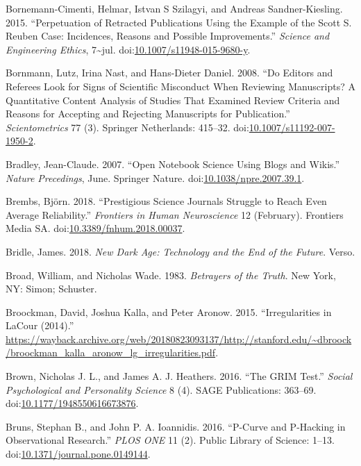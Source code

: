 \documentclass[a5paper]{book}
\begin{document}
\hypertarget{ref-doi:10.1007ux2fs11948-015-9680-y}{}
Bornemann-Cimenti, Helmar, Istvan S Szilagyi, and Andreas
Sandner-Kiesling. 2015. ``Perpetuation of Retracted Publications Using
the Example of the Scott S. Reuben Case: Incidences, Reasons and
Possible Improvements.'' \emph{Science and Engineering Ethics},
7\textasciitilde{}jul.
doi:\href{https://doi.org/10.1007/s11948-015-9680-y}{10.1007/s11948-015-9680-y}.

\hypertarget{ref-doi:10.1007ux2fs11192-007-1950-2}{}
Bornmann, Lutz, Irina Nast, and Hans-Dieter Daniel. 2008. ``Do Editors
and Referees Look for Signs of Scientific Misconduct When Reviewing
Manuscripts? A Quantitative Content Analysis of Studies That Examined
Review Criteria and Reasons for Accepting and Rejecting Manuscripts for
Publication.'' \emph{Scientometrics} 77 (3). Springer Netherlands:
415--32.
doi:\href{https://doi.org/10.1007/s11192-007-1950-2}{10.1007/s11192-007-1950-2}.

\hypertarget{ref-doi:10.1038ux2fnpre.2007.39.1}{}
Bradley, Jean-Claude. 2007. ``Open Notebook Science Using Blogs and
Wikis.'' \emph{Nature Precedings}, June. Springer Nature.
doi:\href{https://doi.org/10.1038/npre.2007.39.1}{10.1038/npre.2007.39.1}.

\hypertarget{ref-doi:10.3389ux2ffnhum.2018.00037}{}
Brembs, Björn. 2018. ``Prestigious Science Journals Struggle to Reach
Even Average Reliability.'' \emph{Frontiers in Human Neuroscience} 12
(February). Frontiers Media SA.
doi:\href{https://doi.org/10.3389/fnhum.2018.00037}{10.3389/fnhum.2018.00037}.

\hypertarget{ref-isbn:9781786635471}{}
Bridle, James. 2018. \emph{New Dark Age: Technology and the End of the
Future}. Verso.

\hypertarget{ref-isbn:9780671447694}{}
Broad, William, and Nicholas Wade. 1983. \emph{Betrayers of the Truth}.
New York, NY: Simon; Schuster.

\hypertarget{ref-lg-irreg}{}
Broockman, David, Joshua Kalla, and Peter Aronow. 2015. ``Irregularities
in LaCour (2014).''
\url{https://wayback.archive.org/web/20180823093137/http://stanford.edu/~dbroock/broockman_kalla_aronow_lg_irregularities.pdf}.

\hypertarget{ref-doi:10.1177ux2f1948550616673876}{}
Brown, Nicholas J. L., and James A. J. Heathers. 2016. ``The GRIM
Test.'' \emph{Social Psychological and Personality Science} 8 (4). SAGE
Publications: 363--69.
doi:\href{https://doi.org/10.1177/1948550616673876}{10.1177/1948550616673876}.

\hypertarget{ref-doi:10.1371ux2fjournal.pone.0149144}{}
Bruns, Stephan B., and John P. A. Ioannidis. 2016. ``P-Curve and
P-Hacking in Observational Research.'' \emph{PLOS ONE} 11 (2). Public
Library of Science: 1--13.
doi:\href{https://doi.org/10.1371/journal.pone.0149144}{10.1371/journal.pone.0149144}.
\end{document}
